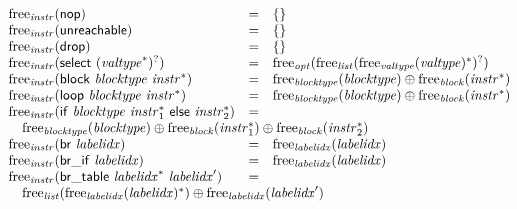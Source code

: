 $$
\begin{array}[t]{@{}lcl@{}l@{}}
{\mathrm{free}}_{\mathit{instr}}(\mathsf{nop}) & = & \{  \} \\
{\mathrm{free}}_{\mathit{instr}}(\mathsf{unreachable}) & = & \{  \} \\
{\mathrm{free}}_{\mathit{instr}}(\mathsf{drop}) & = & \{  \} \\
{\mathrm{free}}_{\mathit{instr}}(\mathsf{select}~{({{\mathit{valtype}}^\ast})^?}) & = & {\mathrm{free}}_{\mathit{opt}}({{\mathrm{free}}_{\mathit{list}}({{\mathrm{free}}_{\mathit{valtype}}({\mathit{valtype}})^\ast})^?}) \\
{\mathrm{free}}_{\mathit{instr}}(\mathsf{block}~{\mathit{blocktype}}~{{\mathit{instr}}^\ast}) & = & {\mathrm{free}}_{\mathit{blocktype}}({\mathit{blocktype}}) \oplus {\mathrm{free}}_{\mathit{block}}({{\mathit{instr}}^\ast}) \\
{\mathrm{free}}_{\mathit{instr}}(\mathsf{loop}~{\mathit{blocktype}}~{{\mathit{instr}}^\ast}) & = & {\mathrm{free}}_{\mathit{blocktype}}({\mathit{blocktype}}) \oplus {\mathrm{free}}_{\mathit{block}}({{\mathit{instr}}^\ast}) \\
{\mathrm{free}}_{\mathit{instr}}(\mathsf{if}~{\mathit{blocktype}}~{{\mathit{instr}}_1^\ast}~\mathsf{else}~{{\mathit{instr}}_2^\ast}) & = & & \\
 \multicolumn{4}{@{}l@{}}{\quad
\begin{array}[t]{@{}l@{}}
{\mathrm{free}}_{\mathit{blocktype}}({\mathit{blocktype}}) \oplus {\mathrm{free}}_{\mathit{block}}({{\mathit{instr}}_1^\ast}) \oplus {\mathrm{free}}_{\mathit{block}}({{\mathit{instr}}_2^\ast}) \\
\end{array}
} \\
{\mathrm{free}}_{\mathit{instr}}(\mathsf{br}~{\mathit{labelidx}}) & = & {\mathrm{free}}_{\mathit{labelidx}}({\mathit{labelidx}}) \\
{\mathrm{free}}_{\mathit{instr}}(\mathsf{br\_if}~{\mathit{labelidx}}) & = & {\mathrm{free}}_{\mathit{labelidx}}({\mathit{labelidx}}) \\
{\mathrm{free}}_{\mathit{instr}}(\mathsf{br\_table}~{{\mathit{labelidx}}^\ast}~{\mathit{labelidx}'}) & = & & \\
 \multicolumn{4}{@{}l@{}}{\quad
\begin{array}[t]{@{}l@{}}
{\mathrm{free}}_{\mathit{list}}({{\mathrm{free}}_{\mathit{labelidx}}({\mathit{labelidx}})^\ast}) \oplus {\mathrm{free}}_{\mathit{labelidx}}({\mathit{labelidx}'}) \\

\end{array}}
\end{array}$$
